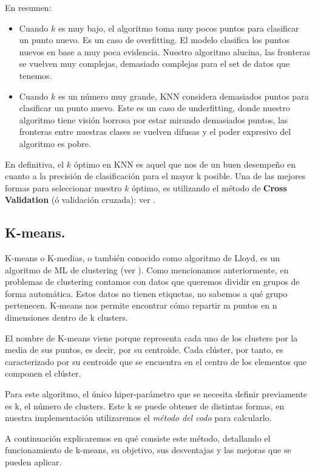 \documentclass[12pt,a4paper]{article}
\begin{document}
\begin{sloppypar}
En resumen:
\begin{itemize}
\item Cuando $k$ es muy bajo, el algoritmo toma muy pocos puntos para clasificar un punto nuevo. Es un caso de overfitting. El modelo clasifica los puntos nuevos en base a muy poca evidencia. Nuestro algoritmo alucina, las fronteras se vuelven muy complejas, demasiado complejas para el set de datos que tenemos. 
\item Cuando $k$ es un número muy grande, KNN considera demasiados puntos para clasificar un punto nuevo. Este es un caso de underfitting, donde nuestro algoritmo tiene visión borrosa por estar mirando demasiados puntos, las fronteras entre nuestras clases se vuelven difusas y el poder expresivo del algoritmo es pobre. 
\end{itemize}

En definitiva, el $k$ óptimo en KNN es aquel que nos de un buen desempeño en cuanto a la precisión de clasificación para el mayor k posible. Una de las mejores formas para seleccionar nuestro $k$ óptimo, es utilizando el método de \textbf{Cross Validation} (ó validación cruzada): ver \textit{}.

\cleardoublepage
\subsection{K-means.}\label{k_means_3_4}
K-means o K-medias, o también conocido como algoritmo de Lloyd, es un algoritmo de ML de clustering (ver \textit{}). Como mencionamos anteriormente, en problemas de clustering contamos con datos que queremos dividir en grupos de forma automática. Estos datos no tienen etiquetas, no sabemos a qué grupo pertenecen. K-means nos permite encontrar cómo repartir m puntos en n dimensiones dentro de k clusters.

El nombre de K-means viene porque representa cada uno de los clusters por la media de sus puntos, es decir, por su centroide. Cada clúster, por tanto, es caracterizado por su centroide que se encuentra en el centro de los elementos que componen el clúster.

Para este algoritmo, el único hiper-parámetro que se necesita definir previamente es k, el número de clusters. Este k se puede obtener de distintas formas, en nuestra implementación utilizaremos el \textit{método del codo} para calcularlo. 

A continuación explicaremos en qué consiste este método, detallando el funcionamiento de k-means, su objetivo, sus desventajas y las mejoras que se pueden aplicar.


\end{sloppypar}
\end{document}
